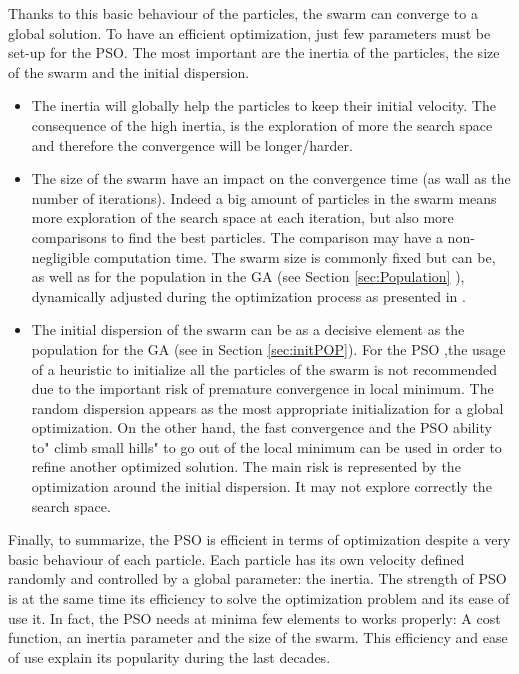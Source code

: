 Thanks to this basic behaviour of the particles, the swarm can converge to a global solution. 
To have an efficient optimization, just few parameters must be set-up for the PSO.  
The most important are the inertia of the particles, the size of the swarm and the initial dispersion.
\begin{itemize}
\item The inertia will globally help the particles to keep their initial velocity. The consequence of the high inertia, is the exploration of more the search space and therefore the convergence will be longer/harder. 
\item The size of the swarm  have an impact on the convergence time (as wall as the  number of iterations).  Indeed a big amount of particles in the swarm  means more exploration of the search space at each iteration, but also more comparisons to find the best particles. The comparison may have a non-negligible computation time. 
The swarm size is commonly fixed but can be, as well as for the population in the GA (see Section \ref{sec:Population} ), dynamically adjusted during the optimization process as presented in \cite{228*leong2008}.  

\item The initial dispersion of the swarm can be as a decisive element as the population for the GA (see in Section \ref{sec:initPOP}). For the PSO ,the usage of a heuristic to initialize all the particles of the swarm is not recommended due to the important risk of premature convergence in local minimum. The random dispersion appears as the most appropriate initialization for a global optimization. On the other hand, the fast convergence and the PSO ability to" climb small hills" to go out of the local minimum can be used in order to refine another optimized solution. The main risk is represented by the  optimization around the initial dispersion. It may not explore correctly the search space.  
\end{itemize}

Finally, to summarize, the PSO is efficient in terms of optimization despite a very basic behaviour of each  particle. Each particle has its own velocity defined randomly and controlled by a global parameter: the inertia.
 The strength of PSO is at the same time its efficiency to solve the optimization problem and its ease of use it. In fact, the PSO needs at minima few elements to works properly:
 A cost function, an inertia parameter and the size of the swarm. This efficiency and ease of use explain its popularity during the last decades.
  





